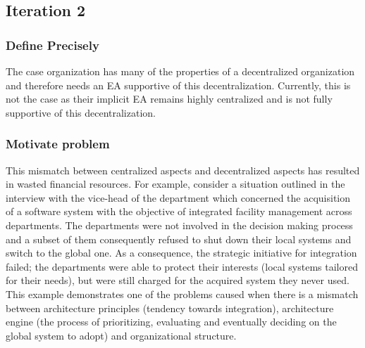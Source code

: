 



\subsection{Iteration 2}

\subsubsection*{Define Precisely}


The case organization has many of the properties of a decentralized organization and therefore needs an EA supportive of this decentralization. Currently, this is not the case as their implicit EA remains highly centralized and is not fully supportive of this decentralization. 


\subsubsection*{Motivate problem}


This mismatch between centralized aspects and decentralized aspects has resulted in wasted financial resources. For example, consider a situation outlined in the interview with the vice-head of the department which concerned the acquisition of a software system with the objective of integrated facility management across departments. The departments were not involved in the decision making process and a subset of them consequently refused to shut down their local systems and switch to the global one. As a consequence, the strategic initiative for integration failed; the departments were able to protect their interests (local systems tailored for their needs), but were still charged for the acquired system they never used. This example demonstrates one of the problems caused when there is a mismatch between architecture principles (tendency towards integration), architecture engine (the process of prioritizing, evaluating and eventually deciding on the global system to adopt) and organizational structure.

